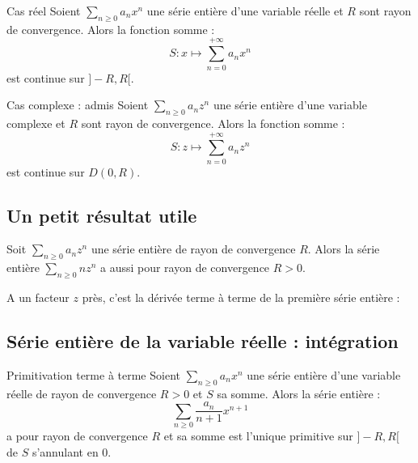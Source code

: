 \documentclass[french,11pt,twoside]{VcCours}
\begin{document}
\begin{Theoreme}{Cas réel} Soient $\sum_{n \geq 0} a_n x^n$ une série entière d'une variable réelle et $R$ sont rayon de convergence. Alors la fonction somme :
$$ S : x \mapsto \sum_{n=0}^{+ \infty} a_n x^n $$
est continue sur $]-R,R[$.
\end{Theoreme}

\begin{Demonstration}{}
\vspace{4cm}
\end{Demonstration}

\begin{Theoreme}{Cas complexe : admis} Soient $\sum_{n \geq 0} a_n z^n$ une série entière d'une variable complexe et $R$ sont rayon de convergence. Alors la fonction somme :
$$ S : z \mapsto \sum_{n=0}^{+ \infty} a_n z^n $$
est continue sur $D(0,R)$.
\end{Theoreme}

\subsection{Un petit résultat utile}

\begin{Proposition}{} Soit $\sum_{n \geq 0} a_n z^n$ une série entière de rayon de convergence $R$. Alors la série entière $\sum_{n \geq 0} n z^n$ a aussi pour rayon de convergence $R>0$.
\end{Proposition}

\begin{Remarque}{} A un facteur $z$ près, c'est la \og dérivée terme à terme \fg de la première série entière :

\vspace{3cm}
\end{Remarque}

\begin{Demonstration}{}
\vspace{7.5cm}
\end{Demonstration} 



\subsection{Série entière de la variable réelle : intégration}

\begin{Theoreme}{Primitivation terme à terme}
Soient $\sum_{n \geq 0} a_n x^n$ une série entière d'une variable réelle de rayon de convergence $R>0$ et $S$ sa somme. Alors la série entière :
$$ \sum_{n \geq 0}  \dfrac{a_n}{n+1} x^{n+1}$$
a pour rayon de convergence $R$ et sa somme est l'unique primitive sur $]-R,R[$ de $S$ s'annulant en $0$.
\end{Theoreme}
\end{document}
